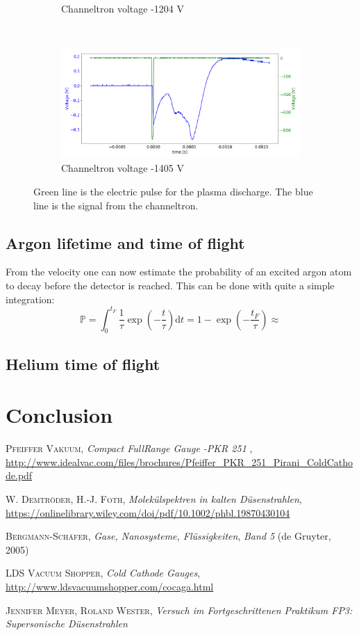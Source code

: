\documentclass[a4paper,10pt]{article}
\begin{document}
\begin{figure}[H]
\begin{subfigure}[t]{0.45 \textwidth}
    \caption{Channeltron voltage -1204 V}
  \end{subfigure}
  ~
  \begin{subfigure}[t]{0.45 \textwidth}
    \centering
    \includegraphics[width=\textwidth]{channeltron5}
    \caption{Channeltron voltage -1405 V}
  \end{subfigure}
  \caption{Green line is the electric pulse for the plasma discharge. The blue line is the signal from the channeltron. }
  \label{channeltron}
\end{figure}
\subsection{Argon lifetime and time of flight}
From the velocity one can now estimate the probability of an excited argon atom to decay before the detector is reached. This can be done with quite a simple integration:
\begin{equation}
	\mathbb{P} = \int_0^{t_F} \frac{1}{\tau} \exp(-\frac{t}{\tau}) \mathrm{d}t = 1 - \exp(-\frac{t_F}{\tau}) \approx 
\end{equation}
\subsection{Helium time of flight}

\section{Conclusion}

\begin{thebibliography}{99}
\textsc{Pfeiffer Vakuum}, \textit{Compact FullRange Gauge -PKR 251 }, \url{http://www.idealvac.com/files/brochures/Pfeiffer_PKR_251_Pirani_ColdCathode.pdf}

\textsc{W. Demtröder, H.-J. Foth}, \textit{Molekülspektren in kalten Düsenstrahlen}, \url{https://onlinelibrary.wiley.com/doi/pdf/10.1002/phbl.19870430104}

\textsc{Bergmann-Schäfer}, \textit{Gase, Nanosysteme, Flüssigkeiten}, \textit{Band 5} (de Gruyter, 2005)

\textsc{LDS Vacuum Shopper}, \textit{Cold Cathode Gauges}, \url{http://www.ldsvacuumshopper.com/cocaga.html}

\textsc{Jennifer Meyer, Roland Wester}, \textit{Versuch im Fortgeschrittenen Praktikum FP3: Supersonische Düsenstrahlen}
\end{thebibliography}
\end{document}
